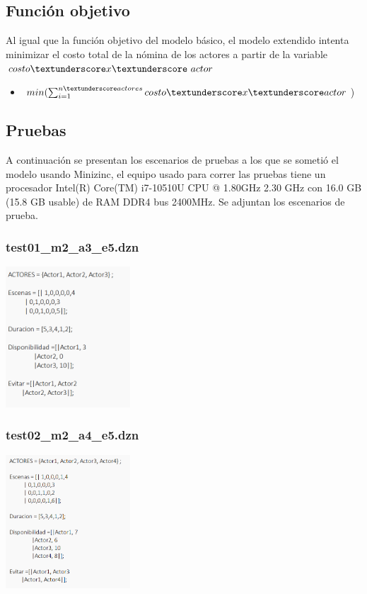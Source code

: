 \documentclass{article}
\begin{document}
\subsection{Función objetivo}
Al igual que la función objetivo del modelo básico, el modelo extendido intenta minimizar el costo total de la nómina de los actores a partir de la variable $costo\textunderscore x\textunderscore\ actor$
\begin{itemize}
    \item $min(\sum_{i=1}^{n\textunderscore actores}costo\textunderscore x\textunderscore actor$)
\end{itemize}

\subsection{Pruebas}
A continuación se presentan los escenarios de pruebas a los que se sometió el modelo usando Minizinc, el equipo usado para correr las pruebas tiene un procesador Intel(R) Core(TM) i7-10510U CPU @ 1.80GHz   2.30 GHz con 16.0 GB (15.8 GB usable) de RAM DDR4 bus 2400MHz.\newline
Se adjuntan los escenarios de prueba.

\subsubsection{test01_m2_a3_e5.dzn}
\begin{center}
    \includegraphics[width=0.35\textwidth]{img/test05_m2.png}
\end{center}

\subsubsection{test02_m2_a4_e5.dzn}
\begin{center}
    \includegraphics[width=0.35\textwidth]{img/test06_m2.png}
\end{center}
\end{document}
